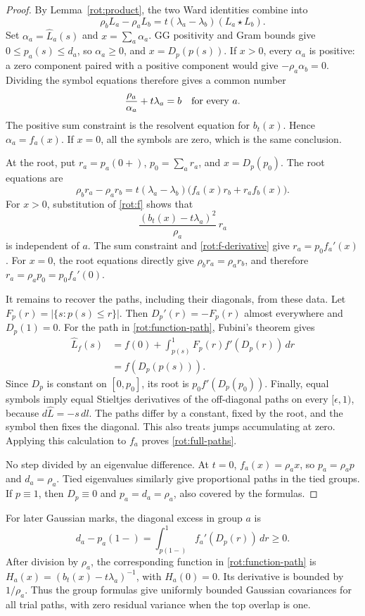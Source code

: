 \begin{proof}
By Lemma~\ref{rot:product}, the two Ward identities combine into
\[
 \rho_bL_a-\rho_aL_b
      =t(\lambda_a-\lambda_b)(L_a\star L_b).
\]
Set \(\alpha_a=\widehat L_a(s)\) and \(x=\sum_a\alpha_a\).
GG positivity and Gram bounds give \(0\le p_a(s)\le d_a\),
so \(\alpha_a\ge0\),
and \(x=D_p(p(s))\).
If \(x>0\), every \(\alpha_a\) is positive: a zero component
paired with a positive component would give
\(-\rho_a\alpha_b=0\).
Dividing the symbol equations therefore gives a common number
\[
 \frac{\rho_a}{\alpha_a}+t\lambda_a=b
       \quad\hbox{for every }a.
\]
The positive sum constraint is the resolvent equation for \(b_t(x)\).
Hence \(\alpha_a=f_a(x)\).  If \(x=0\), all the symbols are zero,
which is the same conclusion.

At the root, put \(r_a=p_a(0+)\), \(p_0=\sum_a r_a\), and
\(x=D_p(p_0)\).  The root equations are
\[
 \rho_b r_a-\rho_a r_b
 =t(\lambda_a-\lambda_b)
        \bigl(f_a(x)r_b+r_a f_b(x)\bigr).
\]
For \(x>0\), substitution of \eqref{rot:f} shows that
\[
 \frac{(b_t(x)-t\lambda_a)^2}{\rho_a}\,r_a
\]
is independent of \(a\).  The sum constraint and
\eqref{rot:f-derivative} give \(r_a=p_0f_a'(x)\).
For \(x=0\), the root equations directly give
\(\rho_b r_a=\rho_a r_b\), and therefore
\(r_a=\rho_a p_0=p_0 f_a'(0)\).

It remains to recover the paths, including their diagonals, from
these data.  Let \(F_p(r)=|\{s:p(s)\le r\}|\).  Then
\(D_p'(r)=-F_p(r)\) almost everywhere and \(D_p(1)=0\).
For the path in \eqref{rot:function-path}, Fubini's theorem gives
\[
 \begin{split}
 \widehat L_f(s)
 &=f(0)+\int_{p(s)}^1 F_p(r)f'(D_p(r))\,dr\\
 &=f(D_p(p(s))).
 \end{split}
\]
Since \(D_p\) is constant on \([0,p_0]\), its root is
\(p_0 f'(D_p(p_0))\).
Finally, equal symbols imply equal Stieltjes derivatives of the
off-diagonal paths on every \([\epsilon,1)\), because
\(d\widehat L=-s\,dl\).  The paths differ by a constant, fixed by
the root, and the symbol then fixes the diagonal.  This also treats
jumps accumulating at zero.  Applying this calculation to \(f_a\)
proves \eqref{rot:full-paths}.

No step divided by an eigenvalue difference.  At \(t=0\),
\(f_a(x)=\rho_a x\), so \(p_a=\rho_a p\) and \(d_a=\rho_a\).
Tied eigenvalues similarly give proportional paths in the tied
groups.  If \(p\equiv1\), then \(D_p\equiv0\) and
\(p_a=d_a=\rho_a\), also covered by the formulas.
\end{proof}

For later Gaussian marks, the diagonal excess in group \(a\) is
\[
 d_a-p_a(1-)=\int_{p(1-)}^1 f_a'(D_p(r))\,dr\ge0.
\]
After division by \(\rho_a\), the corresponding function in
\eqref{rot:function-path} is
\(H_a(x)=(b_t(x)-t\lambda_a)^{-1}\), with \(H_a(0)=0\).
Its derivative is bounded by \(1/\rho_a\).
Thus the group formulas give uniformly bounded Gaussian
covariances for all trial paths, with zero residual variance when
the top overlap is one.
